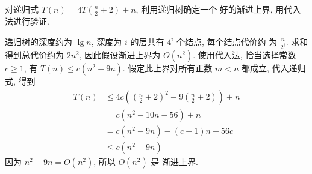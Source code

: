 \documentclass[boxes]{homework}
\begin{document}
\begin{problem}
对递归式 $T(n) = 4 T \left( \frac{ n }{ 2 } + 2\right) + n$, 利用递归树确定一个
好的渐进上界, 用代入法进行验证.
\end{problem}
\begin{solution}
    递归树的深度约为 $\lg n$, 深度为 $i$ 的层共有 $4^{i}$ 个结点, 每个结点代价约
    为 $\frac{ n }{ 2^{i} }$. 求和得到总代价约为 $2 n^{2}$, 因此假设渐进上界为
    $O \left( n^{2}\right)$. 使用代入法, 恰当选择常数 $c \geqslant 1$,
    有 $T(n) \leqslant c \left( n^{2} - 9n\right)$. 假定此上界对所有正数
    $m < n$ 都成立, 代入递归式, 得到
    \begin{equation}
        \begin{aligned}
            T(n)
             & \leqslant 4 c \left( {\left( \frac{ n }{ 2 } + 2\right)}^{2}
            - 9 \left( \frac{ n }{ 2 } + 2\right)\right) + n                \\
             & = c \left( n^{2} - 10n - 56\right) + n                       \\
             & = c \left( n^{2} - 9n\right) - (c - 1) n - 56c               \\
             & \leqslant c \left( n^{2} - 9n\right)
        \end{aligned}
    \end{equation}
    因为 $n^{2} - 9n = O \left( n^{2}\right)$, 所以 $O \left( n^{2}\right)$ 是
    渐进上界.
\end{solution}
\end{document}
